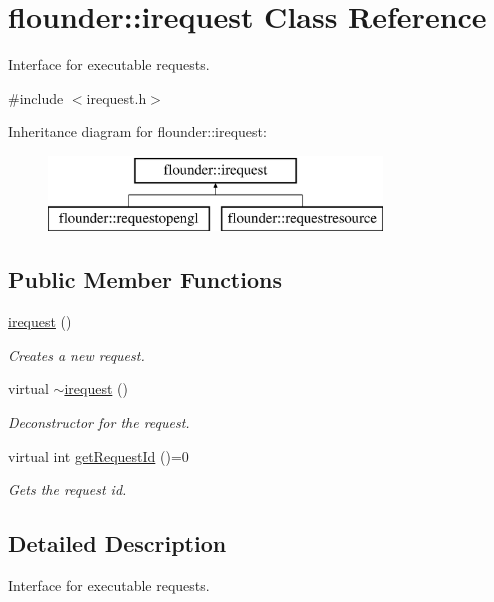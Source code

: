 \hypertarget{classflounder_1_1irequest}{}\section{flounder\+:\+:irequest Class Reference}
\label{classflounder_1_1irequest}


Interface for executable requests.  




{\ttfamily \#include $<$irequest.\+h$>$}

Inheritance diagram for flounder\+:\+:irequest\+:\begin{figure}[H]
\begin{center}
\leavevmode
\includegraphics[height=2.000000cm]{classflounder_1_1irequest}
\end{center}
\end{figure}
\subsection*{Public Member Functions}
\begin{DoxyCompactItemize}
\item 
\hyperlink{classflounder_1_1irequest_a3b98d54ecf178042710c6a53175682de}{irequest} ()
\begin{DoxyCompactList}\small\item\em Creates a new request. \end{DoxyCompactList}\item 
virtual \hyperlink{classflounder_1_1irequest_afb706d6aca6ad7c689c17265c245d4fa}{$\sim$irequest} ()
\begin{DoxyCompactList}\small\item\em Deconstructor for the request. \end{DoxyCompactList}\item 
virtual int \hyperlink{classflounder_1_1irequest_a69e6b820c6635486e488e6aa18b11730}{get\+Request\+Id} ()=0
\begin{DoxyCompactList}\small\item\em Gets the request id. \end{DoxyCompactList}\end{DoxyCompactItemize}


\subsection{Detailed Description}
Interface for executable requests. 



